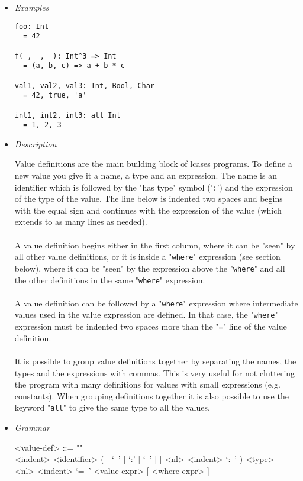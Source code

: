 \documentclass[diploma]{softlab-thesis}
\begin{document}
\begin{itemize}

\item \textit{Examples}

\begin{verbatim}
foo: Int
  = 42

f(_, _, _): Int^3 => Int
  = (a, b, c) => a + b * c

val1, val2, val3: Int, Bool, Char
  = 42, true, 'a'

int1, int2, int3: all Int
  = 1, 2, 3
\end{verbatim}

\item \textit{Description}

Value definitions are the main building block of lcases programs. To define a
new value you give it a name, a type and an expression. The name is an
identifier which is followed by the "has type" symbol ('\verb|:|') and the
expression of the type of the value. The line below is indented two spaces and
begins with the equal sign and continues with the expression of the value
(which extends to as many lines as needed).
\\\\
A value definition begins either in the first column, where it can be "seen" by
all other value definitions, or it is inside a "\verb|where|" expression (see
section below), where it can be "seen" by the expression above the
"\verb|where|" and all the other definitions in the same "\verb|where|"
expression.
\\\\
A value definition can be followed by a "\verb|where|" expression where
intermediate values used in the value expression are defined. In that case, the
"\verb|where|" expression must be indented two spaces more than the "\verb|=|"
line of the value definition.
\\\\
It is possible to group value definitions together by separating the names, the
types and the expressions with commas. This is very useful for not cluttering
the program with many definitions for values with small expressions (e.g.
constants).  When grouping definitions together it is also possible to use the
keyword "\verb|all|" to give the same type to all the values.

\item \textit{Grammar}
\begin{grammar}
<value-def> ::= ""\\
<indent> <identifier>
( [ `\ ' ] `:' [ `\ ' ] | <nl> <indent> `:\ ' ) <type>  \\
<nl> <indent> `=\ ' <value-expr> [ <where-expr> ]


\end{grammar}
\end{itemize}
\end{document}
